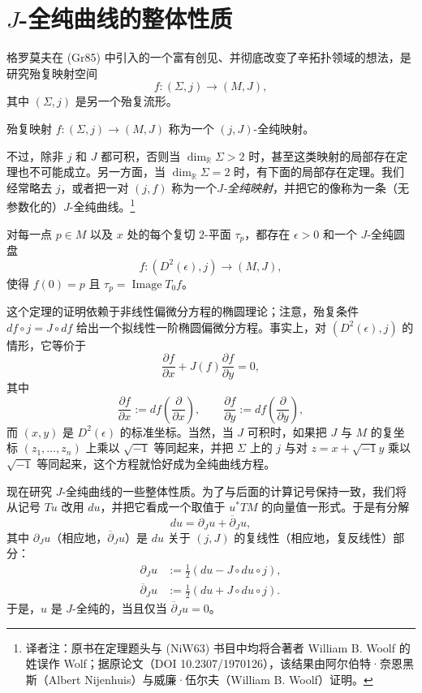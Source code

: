 \section{\texorpdfstring{$J$-全纯曲线的整体性质}{J-全纯曲线的整体性质}}
\label{sec:global-properties-j-holomorphic-curves}

格罗莫夫在 (Gr85) 中引入的一个富有创见、并彻底改变了辛拓扑领域的想法，是研究殆复映射空间
\[
 f:(\Sigma,j)\longrightarrow(M,J),
\]
其中 $(\Sigma,j)$ 是另一个殆复流形。

\begin{definition}\label{def:j-holomorphic-map}
殆复映射 $f:(\Sigma,j)\to(M,J)$ 称为一个 $(j,J)$-全纯映射。
\end{definition}

不过，除非 $j$ 和 $J$ 都可积，否则当 $\dim_{\mathbb R}\Sigma>2$ 时，甚至这类映射的局部存在定理也不可能成立。另一方面，当 $\dim_{\mathbb R}\Sigma=2$ 时，有下面的局部存在定理。我们经常略去 $j$，或者把一对 $(j,f)$ 称为一个\emph{$J$-全纯映射}，并把它的像称为一条（无参数化的）$J$-全纯曲线。\footnote{译者注：原书在定理题头与 (NiW63) 书目中均将合著者 William B. Woolf 的姓误作 Wolf；据原论文（DOI 10.2307/1970126），该结果由阿尔伯特·奈恩黑斯（Albert Nijenhuis）与威廉·伍尔夫（William B. Woolf）证明。}

\begin{theorem}\label{thm:nijenhuis-wolf-local-disc}
对每一点 $p\in M$ 以及 $x$ 处的每个复切 $2$-平面 $\tau_p$，都存在 $\epsilon>0$ 和一个 $J$-全纯圆盘
\[
 f:(D^2(\epsilon),j)\longrightarrow(M,J),
\]
使得 $f(0)=p$ 且 $\tau_p=\operatorname{Image}T_0f$。
\end{theorem}

这个定理的证明依赖于非线性偏微分方程的椭圆理论；注意，殆复条件
$df\circ j=J\circ df$ 给出一个拟线性一阶椭圆偏微分方程。事实上，对 $(D^2(\epsilon),j)$ 的情形，它等价于
\[
 \frac{\partial f}{\partial x}
 +J(f)\frac{\partial f}{\partial y}=0,
\]
其中
\[
 \frac{\partial f}{\partial x}:=df\left(\frac\partial{\partial x}\right),
 \qquad
 \frac{\partial f}{\partial y}:=df\left(\frac\partial{\partial y}\right),
\]
而 $(x,y)$ 是 $D^2(\epsilon)$ 的标准坐标。当然，当 $J$ 可积时，如果把 $J$ 与 $M$ 的复坐标 $(z_1,\ldots,z_n)$ 上乘以 $\sqrt{-1}$ 等同起来，并把 $\Sigma$ 上的 $j$ 与对 $z=x+\sqrt{-1}y$ 乘以 $\sqrt{-1}$ 等同起来，这个方程就恰好成为全纯曲线方程。

现在研究 $J$-全纯曲线的一些整体性质。为了与后面的计算记号保持一致，我们将从记号 $Tu$ 改用 $du$，并把它看成一个取值于 $u^*TM$ 的向量值一形式。于是有分解
\begin{equation}
 du=\partial_Ju+\overline\partial_Ju,
 \label{eq:du-j-complex-decomposition}
\end{equation}
其中 $\partial_Ju$（相应地，$\overline\partial_Ju$）是 $du$ 关于 $(j,J)$ 的复线性（相应地，复反线性）部分：
\begin{align}
 \partial_Ju&:=\frac12(du-J\circ du\circ j),
 \label{eq:j-complex-linear-part}\\
 \overline\partial_Ju&:=\frac12(du+J\circ du\circ j).
 \label{eq:j-antilinear-part}
\end{align}
于是，$u$ 是 $J$-全纯的，当且仅当 $\overline\partial_Ju=0$。

